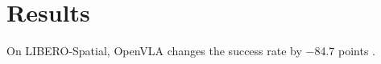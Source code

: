 \documentclass{article}
\begin{document}
\section{Results}
On LIBERO-Spatial, OpenVLA changes the success rate by $-$84.7 points \citep{kim}.



\end{document}
